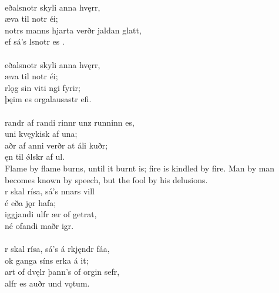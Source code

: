  \\

\bva {}eðalsnotr \hld skyli anna hvęrr, \\%
\ind æva til notr éi; \\%
notrs manns hjarta \hld verðr jaldan glatt, \\%
\ind ef sá's lsnotr es .\\%

 \\

\bva {}eðalsnotr \hld skyli anna hvęrr, \\%
\ind æva til notr éi; \\%
rlǫg sin \hld viti ngi fyrir; \\%
\ind þęim es orgalausastr efi.\\%

 \\

\bva {}randr af randi \hld {}rinnr unz runninn es, \\%
\ind {}uni kvęykisk af una; \\%
aðr af anni \hld verðr at áli kuðr; \\%
\ind ęn til ǿlskr af ul.\\%

\bvb Flame by flame burns, until it burnt is; fire is kindled by fire. Man by man becomes known by speech, but the fool by his delusions. \\

\bva {}r skal rísa, \hld sá's nnars vill \\%
\ind {}é eða jǫr hafa; \\%
iggjandi ulfr \hld {}ær of getrat, \\%
\ind né ofandi maðr igr.\\%

 \\

\bva {}r skal rísa, \hld sá's á rkjęndr fáa, \\%
\ind ok ganga síns erka á it; \\%
art of dvęlr \hld þann's of orgin sefr, \\%
\ind {}alfr es auðr und vǫtum.\\%

